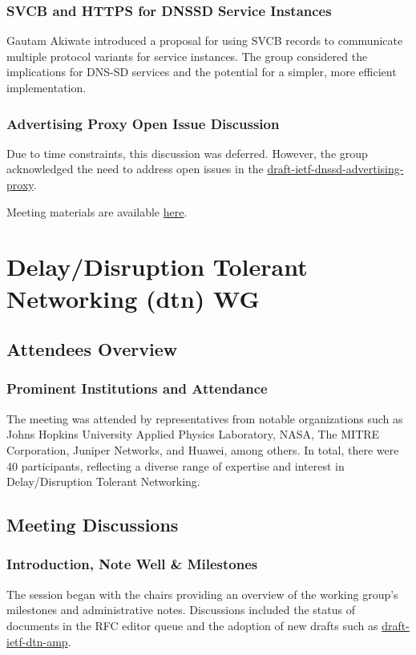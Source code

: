 \documentclass{article}
\begin{document}
\subsubsection{SVCB and HTTPS for DNSSD Service Instances}
Gautam Akiwate introduced a proposal for using SVCB records to communicate multiple protocol variants for service instances. The group considered the implications for DNS-SD services and the potential for a simpler, more efficient implementation.

\subsubsection{Advertising Proxy Open Issue Discussion}
Due to time constraints, this discussion was deferred. However, the group acknowledged the need to address open issues in the \href{https://datatracker.ietf.org/doc/draft-ietf-dnssd-advertising-proxy/}{draft-ietf-dnssd-advertising-proxy}.

Meeting materials are available \href{https://datatracker.ietf.org/meeting/121/materials/slides-121-dnssd-srp-compression-for-constrained-networks-00}{here}.




\newpage

\section{Delay/Disruption Tolerant Networking (dtn) WG}

\subsection{Attendees Overview}
\subsubsection{Prominent Institutions and Attendance}
The meeting was attended by representatives from notable organizations such as Johns Hopkins University Applied Physics Laboratory, NASA, The MITRE Corporation, Juniper Networks, and Huawei, among others. In total, there were 40 participants, reflecting a diverse range of expertise and interest in Delay/Disruption Tolerant Networking.

\subsection{Meeting Discussions}

\subsubsection{Introduction, Note Well \& Milestones}
The session began with the chairs providing an overview of the working group's milestones and administrative notes. Discussions included the status of documents in the RFC editor queue and the adoption of new drafts such as \href{https://datatracker.ietf.org/doc/html/draft-ietf-dtn-amp}{draft-ietf-dtn-amp}.
\end{document}
